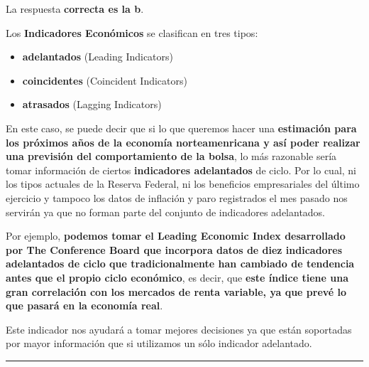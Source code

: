 \documentclass[
  letterpaper,
  DIV=11,
  numbers=noendperiod]{scrreprt}
\begin{document}
\begin{tcolorbox}[enhanced jigsaw, left=2mm, opacityback=0, colback=white, breakable, arc=.35mm, bottomrule=.15mm, rightrule=.15mm, toprule=.15mm, leftrule=.75mm, colframe=quarto-callout-tip-color-frame]
\begin{minipage}[t]{5.5mm}
\textcolor{quarto-callout-tip-color}{\faLightbulb}
\end{minipage}%
\begin{minipage}[t]{\textwidth - 5.5mm}

La respuesta \textbf{correcta es la b}.

Los \textbf{Indicadores Económicos} se clasifican en tres tipos:

\begin{itemize}
\item
  \textbf{adelantados} (Leading Indicators)
\item
  \textbf{coincidentes} (Coincident Indicators)
\item
  \textbf{atrasados} (Lagging Indicators)
\end{itemize}

En este caso, se puede decir que si lo que queremos hacer una
\textbf{estimación para los próximos años de la economía norteamenricana
y así poder realizar una previsión del comportamiento de la bolsa}, lo
más razonable sería tomar información de ciertos \textbf{indicadores
adelantados} de ciclo. Por lo cual, ni los tipos actuales de la Reserva
Federal, ni los beneficios empresariales del último ejercicio y tampoco
los datos de inflación y paro registrados el mes pasado nos servirán ya
que no forman parte del conjunto de indicadores adelantados.

Por ejemplo, \textbf{podemos tomar el Leading Economic Index
desarrollado por The Conference Board que incorpora datos de diez
indicadores adelantados de ciclo que tradicionalmente han cambiado de
tendencia antes que el propio ciclo económico}, es decir, que
\textbf{este índice tiene una gran correlación con los mercados de renta
variable, ya que prevé lo que pasará en la economía real}.

Este indicador nos ayudará a tomar mejores decisiones ya que están
soportadas por mayor información que si utilizamos un sólo indicador
adelantado.

\end{minipage}%
\end{tcolorbox}

\begin{center}\rule{0.5\linewidth}{0.5pt}\end{center}
\end{document}
